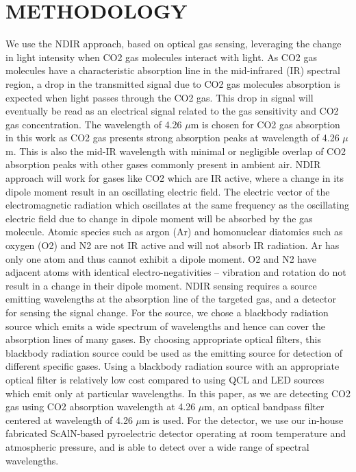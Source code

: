 \documentclass[12pt]{article}
\begin{document}
\section{METHODOLOGY}
We use the NDIR approach, based on optical gas sensing, leveraging 
the change in light intensity when CO2 gas molecules interact with light. 
As CO2 gas molecules have a characteristic absorption line in the mid-infrared (IR) spectral region, a drop in the transmitted signal due 
to CO2 gas molecules absorption is expected when light passes through 
the CO2 gas. This drop in signal will eventually be read as an electrical 
signal related to the gas sensitivity and CO2 gas concentration. The 
wavelength of 4.26 $\mu$m is chosen for CO2 gas absorption in this work as 
CO2 gas presents strong absorption peaks at wavelength of 4.26 $\mu$m\cite{ng2021ndir}. This 
is also the mid-IR wavelength with minimal or negligible overlap of CO2 
absorption peaks with other gases commonly present in ambient air. NDIR approach will work for gases like CO2 which are IR active, 
where a change in its dipole moment result in an oscillating electric 
field. The electric vector of the electromagnetic radiation which oscillates at the same frequency as the oscillating electric field due to change 
in dipole moment will be absorbed by the gas molecule. Atomic species 
such as argon (Ar) and homonuclear diatomics such as oxygen (O2) and 
N2 are not IR active and will not absorb IR radiation. Ar has only one 
atom and thus cannot exhibit a dipole moment. O2 and N2 have adjacent 
atoms with identical electro-negativities – vibration and rotation do not 
result in a change in their dipole moment. 
NDIR sensing requires a source emitting wavelengths at the absorption line of the targeted gas, and a detector for sensing the signal change. 
For the source, we chose a blackbody radiation source which emits a wide 
spectrum of wavelengths and hence can cover the absorption lines of 
many gases. By choosing appropriate optical filters, this blackbody radiation source could be used as the emitting source for detection of 
different specific gases. Using a blackbody radiation source with an 
appropriate optical filter is relatively low cost compared to using QCL and 
LED sources which emit only at particular wavelengths. In this paper, as 
we are detecting CO2 gas using CO2 absorption wavelength at 4.26 $\mu$m, 
an optical bandpass filter centered at wavelength of 4.26 $\mu$m is used. For 
the detector, we use our in-house fabricated ScAlN-based pyroelectric 
detector operating at room temperature and atmospheric pressure, and is 
able to detect over a wide range of spectral wavelengths. 
\end{document}
